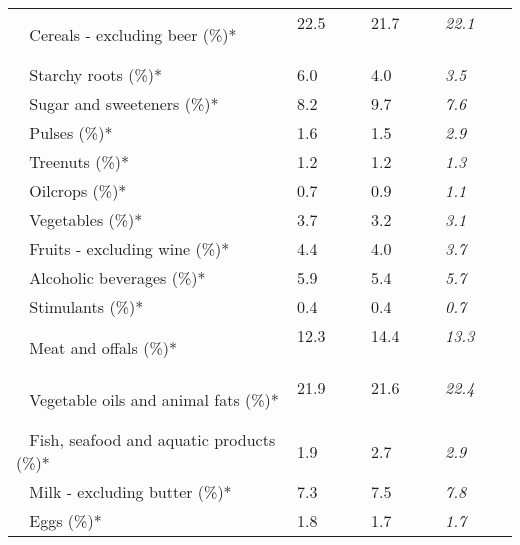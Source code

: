\begin{tabular}{L{3.9cm} R{1cm} R{1cm} R{1cm}}
	 ~ Cereals - excluding beer (\%)* & 22.5 ~ \ \ & 21.7 ~ \ \ & \textit{22.1} ~ \ \ \\ 
	 ~ Starchy roots (\%)* & 6.0 ~ \ \ & 4.0 ~ \ \ & \textit{3.5} ~ \ \ \\ 
	 ~ Sugar and sweeteners (\%)* & 8.2 ~ \ \ & 9.7 ~ \ \ & \textit{7.6} ~ \ \ \\ 
	 ~ Pulses (\%)* & 1.6 ~ \ \ & 1.5 ~ \ \ & \textit{2.9} ~ \ \ \\ 
	 ~ Treenuts (\%)* & 1.2 ~ \ \ & 1.2 ~ \ \ & \textit{1.3} ~ \ \ \\ 
	 ~ Oilcrops (\%)* & 0.7 ~ \ \ & 0.9 ~ \ \ & \textit{1.1} ~ \ \ \\ 
	 ~ Vegetables (\%)* & 3.7 ~ \ \ & 3.2 ~ \ \ & \textit{3.1} ~ \ \ \\ 
	 ~ Fruits - excluding wine (\%)* & 4.4 ~ \ \ & 4.0 ~ \ \ & \textit{3.7} ~ \ \ \\ 
	 ~ Alcoholic beverages (\%)* & 5.9 ~ \ \ & 5.4 ~ \ \ & \textit{5.7} ~ \ \ \\ 
	 ~ Stimulants (\%)* & 0.4 ~ \ \ & 0.4 ~ \ \ & \textit{0.7} ~ \ \ \\ 
	 ~ Meat and offals (\%)* & 12.3 ~ \ \ & 14.4 ~ \ \ & \textit{13.3} ~ \ \ \\ 
	 ~ Vegetable oils and animal fats (\%)* & 21.9 ~ \ \ & 21.6 ~ \ \ & \textit{22.4} ~ \ \ \\ 
	 ~ Fish, seafood and aquatic products (\%)* & 1.9 ~ \ \ & 2.7 ~ \ \ & \textit{2.9} ~ \ \ \\ 
	 ~ Milk - excluding butter (\%)* & 7.3 ~ \ \ & 7.5 ~ \ \ & \textit{7.8} ~ \ \ \\ 
	 ~ Eggs (\%)* & 1.8 ~ \ \ & 1.7 ~ \ \ & \textit{1.7} ~ \ \ \\ 
       \toprule
      \end{tabular}
      \clearpage
{}
